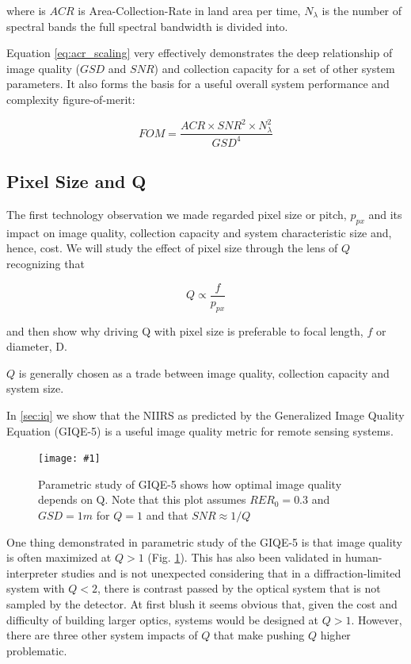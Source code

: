 \documentclass[10pt,journal]{IEEEtran}  %
\newcommand{\includefigure}[3]
{
  \begin{figure}[h!]
  \centering
  \texttt{[image: \#1]}
  \caption[]{#3}
  \label{#2}
  \end{figure}
}
\begin{document}
where is $ACR$ is Area-Collection-Rate in land area per time, $N_{\lambda}$ is the number of spectral bands the full spectral bandwidth is divided into.  

Equation \ref{eq:acr_scaling} very effectively demonstrates the deep relationship of image quality ($GSD$ and $SNR$) and collection capacity for a set of other system parameters.  It also forms the basis for a useful overall system performance and complexity figure-of-merit:

\begin{equation}
    \label{eq:perf_complex_metric}
    FOM = \frac{ACR \times SNR^2 \times N_{\lambda}^2}{GSD^4}
\end{equation}

\subsection{Pixel Size and Q}

The first technology observation we made regarded pixel size or pitch, $p_{px}$ and its impact on image quality, collection capacity and system characteristic size and, hence, cost.  We will study the effect of pixel size through the lens of $Q$ recognizing that

$$Q \propto \frac{f}{p_{px}}$$

and then show why driving Q with pixel size is preferable to focal length, $f$ or diameter, D.

$Q$ is generally chosen as a trade between image quality, collection capacity and system size.  

In \ref{sec:iq} we show that the NIIRS as predicted by the Generalized Image Quality Equation (GIQE-5) is a useful image quality metric for remote sensing systems.

\includefigure{figures/Q_iq.pgf}{fig:q_iq}{Parametric study of GIQE-5 shows how optimal image quality depends on Q.  Note that this plot assumes $RER_0 = 0.3$ and $GSD = 1m$ for $Q=1$ and that $SNR \approx 1 / Q$}

One thing demonstrated in parametric study of the GIQE-5 is that image quality is often maximized at $Q>1$ (Fig. \ref{fig:q_iq}).  This has also been validated in human-interpreter studies \cite{fiete_Q_IQ} and is not unexpected considering that in a diffraction-limited system with $Q<2$, there is contrast passed by the optical system that is not sampled by the detector.  At first blush it seems obvious that, given the cost and difficulty of building larger optics, systems would be designed at $Q>1$.  However, there are three other system impacts of $Q$ that make pushing $Q$ higher problematic.
\end{document}
